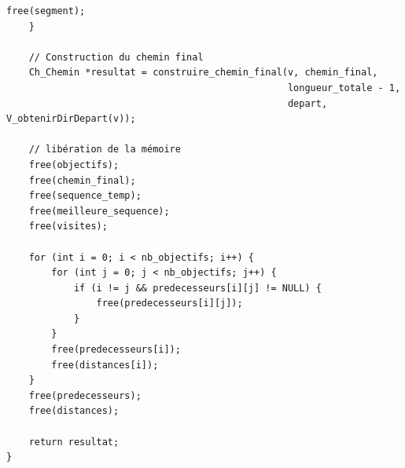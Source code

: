 \begin{lstlisting}[caption={Ch\_genererCheminOptimal}]
        free(segment);
    }
    
    // Construction du chemin final
    Ch_Chemin *resultat = construire_chemin_final(v, chemin_final, 
                                                  longueur_totale - 1,
                                                  depart, V_obtenirDirDepart(v));
    
    // libération de la mémoire
    free(objectifs);
    free(chemin_final);
    free(sequence_temp);
    free(meilleure_sequence);
    free(visites);
    
    for (int i = 0; i < nb_objectifs; i++) {
        for (int j = 0; j < nb_objectifs; j++) {
            if (i != j && predecesseurs[i][j] != NULL) {
                free(predecesseurs[i][j]);
            }
        }
        free(predecesseurs[i]);
        free(distances[i]);
    }
    free(predecesseurs);
    free(distances);

    return resultat;
}
\end{lstlisting}